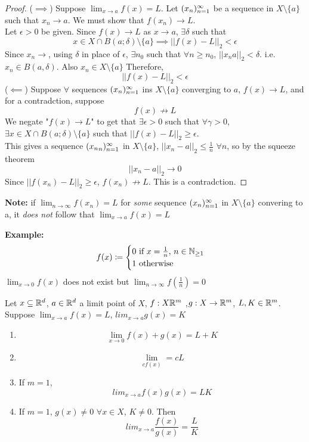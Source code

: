 \documentclass[openany]{report}
\begin{document}
\begin{proof}
    ($\implies$) Suppose $\lim_{x\rightarrow a} f(x) = L$. Let $({x}_n)_{n=1}^\infty$ be a sequence in
    $X \setminus \{a\}$ such that $x_n \rightarrow a$. We must show that $f(x_n) \rightarrow L$.\\[1ex]
    Let $\epsilon > 0$ be given. Since $f(x) \rightarrow L$ as $x \rightarrow a$, $\exists \delta$
    such that 
    $$x \in X \cap B(a; \delta) \setminus \{a\} \implies ||f(x) - L||_2 < \epsilon$$
    Since $x_n \rightarrow$, using $\delta$ in place of $\epsilon$, $\exists n_0$ such that
    $\forall n \geq n_0$, $||x_n a||_2 < \delta$. i.e. $x_n \in B(a,\delta)$. Also 
    $x_n \in X \setminus \{a\}$ Therefore, 
    $$||f(x) - L ||_2 < \epsilon$$
    ($\impliedby$) Suppose $\forall$ sequences $({x}_n)_{n=1}^\infty$ ins $X \setminus \{a\}$ converging to $a$, $f(x) \rightarrow L$,
    and for a contradction, suppose $$f(x) \not\rightarrow L$$
    We negate "$f(x) \rightarrow L$" to get that $\exists \epsilon > 0$ such that $\forall \gamma > 0$,
    $\exists x \in X \cap B(a;\delta) \setminus \{a\}$ such that $||f(x) - L||_2 \geq \epsilon$.\\[1ex]
    This gives a sequence $({x_n}_n)_{n=1}^\infty$ in $X \setminus \{a\}$, $||x_n - a||_2 \leq \frac{1}{n}$ $\forall n$,
    so by the squeeze theorem 
    $$||x_n - a||_2 \rightarrow 0$$
    Since $||f(x_n) - L||_2 \geq \epsilon$, $f(x_n) \not\rightarrow L$. This is a contradction.
\end{proof}
\begin{center}
    \textbf{Note:} if $\lim_{n\rightarrow \infty} f(x_n) = L$ for \emph{some} sequence
    $({x}_n)_{n=1}^\infty$ in $X \setminus \{a\}$ convering to a, it \emph{does not} follow
    that $\lim_{x \rightarrow a} f(x) = L$
\end{center}
\textbf{Example:}
$$f(x) \coloneqq\begin{cases}
     0 \text{   if $x = \frac{1}{n}$, $n \in \mathbb{N}_{\geq 1}$}\\
     1 \text{   otherwise}
\end{cases}$$
$\lim_{x\rightarrow 0}f(x)$ does not exist but $\lim_{n\rightarrow \infty}f(\frac{1}{n}) = 0$
\begin{prop}
    Let $x \subseteq \mathbb{R}^d$, $a \in \mathbb{R}^d$ a limit point of $X$, $f: X \mathbb{R}^m$
    ,$g: X \rightarrow \mathbb{R}^m$, $L,K \in \mathbb{R}^m$. Suppose $\lim_{x\rightarrow a} f(x) = L$, 
    $lim_{x\rightarrow a} g(x) = K$
    \begin{enumerate}[label=(\roman*)]
        \item $$\lim_{x \rightarrow 0} f(x) + g(x) = L + K$$
        \item $$\lim_{cf(x)} = cL$$
        \item If $m = 1$, $$lim_{x\rightarrow a}f(x)g(x) = LK$$
        \item If $m=1$, $g(x) \neq 0$ $\forall x \in X$, $K \neq 0$. Then
        $$lim_{x\rightarrow a}\frac{f(x)}{g(x)} = \frac{L}{K}$$
    \end{enumerate}
\end{prop}
\end{document}
